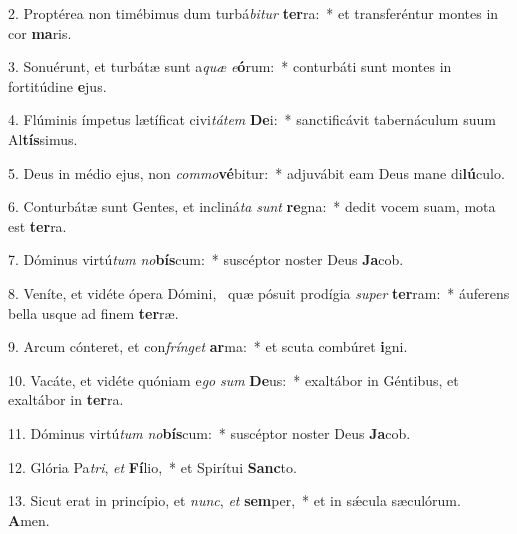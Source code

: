 2. Proptérea non timébimus dum turbá\textit{bi}\textit{tur} \textbf{ter}ra:~*  et transferéntur montes in cor \textbf{ma}ris.\

3. Sonuérunt, et turbátæ sunt a\textit{quæ} \textit{e}\textbf{ó}rum:~*  conturbáti sunt montes in fortitúdine \textbf{e}jus.\

4. Flúminis ímpetus lætíficat civi\textit{tá}\textit{tem} \textbf{De}i:~*  sanctificávit tabernáculum suum Al\textbf{tís}simus.\

5. Deus in médio ejus, non \textit{com}\textit{mo}\textbf{vé}bitur:~*  adjuvábit eam Deus mane di\textbf{lú}culo.\

6. Conturbátæ sunt Gentes, et incliná\textit{ta} \textit{sunt} \textbf{re}gna:~*  dedit vocem suam, mota est \textbf{ter}ra.\

7. Dóminus virtú\textit{tum} \textit{no}\textbf{bís}cum:~*  suscéptor noster Deus \textbf{Ja}cob.\

8. Veníte, et vidéte ópera Dómini, \dag\  quæ pósuit prodígia \textit{su}\textit{per} \textbf{ter}ram:~*  áuferens bella usque ad finem \textbf{ter}ræ.\

9. Arcum cónteret, et con\textit{frín}\textit{get} \textbf{ar}ma:~*  et scuta combúret \textbf{i}gni.\

10. Vacáte, et vidéte quóniam e\textit{go} \textit{sum} \textbf{De}us:~*  exaltábor in Géntibus, et exaltábor in \textbf{ter}ra.\

11. Dóminus virtú\textit{tum} \textit{no}\textbf{bís}cum:~*  suscéptor noster Deus \textbf{Ja}cob.\

12. Glória Pa\textit{tri}, \textit{et} \textbf{Fí}lio,~*  et Spirítui \textbf{Sanc}to.\

13. Sicut erat in princípio, et \textit{nunc}, \textit{et} \textbf{sem}per,~*  et in sǽcula sæculórum. \textbf{A}men.\


